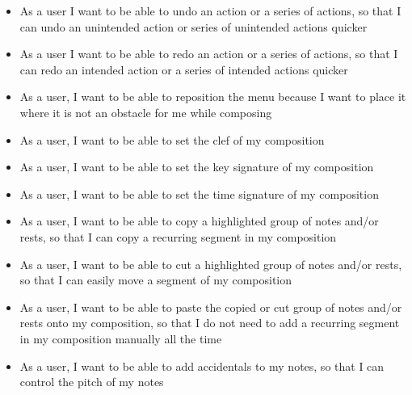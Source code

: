 \begin{itemize}
    \item As a user I want to be able to undo an action or a series of actions, so that I can undo an unintended action or series of unintended actions quicker
    \item As a user I want to be able to redo an action or a series of actions, so that I can redo an intended action or a series of intended actions quicker
    \item As a user, I want to be able to reposition the menu because I want to place it where it is not an obstacle for me while composing
    \item As a user, I want to be able to set the clef of my composition
    \item As a user, I want to be able to set the key signature of my composition
    \item As a user, I want to be able to set the time signature of my composition
    \item As a user, I want to be able to copy a highlighted group of notes and/or rests, so that I can copy a recurring segment in my composition
    \item As a user, I want to be able to cut a highlighted group of notes and/or rests, so that I can easily move a segment of my composition
    \item As a user, I want to be able to paste the copied or cut group of notes and/or rests onto my composition, so that I do not need to add a recurring segment in my composition manually all the time
    \item As a user, I want to be able to add accidentals to my notes, so that I can control the pitch of my notes

\end{itemize}
